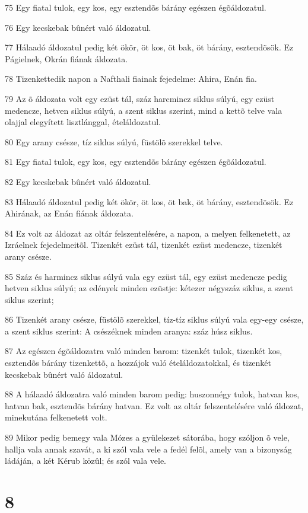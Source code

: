 \par 75 Egy fiatal tulok, egy kos, egy esztendõs bárány egészen égõáldozatul.
\par 76 Egy kecskebak bûnért való áldozatul.
\par 77 Hálaadó áldozatul pedig két ökör, öt kos, öt bak, öt bárány, esztendõsök. Ez Págielnek, Okrán fiának áldozata.
\par 78 Tizenkettedik napon a Nafthali fiainak fejedelme: Ahira, Enán fia.
\par 79 Az õ áldozata volt egy ezüst tál, száz harcmincz siklus súlyú, egy ezüst medencze, hetven siklus súlyú, a szent siklus szerint, mind a kettõ telve vala olajjal elegyített lisztlánggal, ételáldozatul.
\par 80 Egy arany csésze, tíz siklus súlyú, füstölõ szerekkel telve.
\par 81 Egy fiatal tulok, egy kos, egy esztendõs bárány egészen égõáldozatul.
\par 82 Egy kecskebak bûnért való áldozatul.
\par 83 Hálaadó áldozatul pedig két ökör, öt kos, öt bak, öt bárány, esztendõsök. Ez Ahirának, az Enán fiának áldozata.
\par 84 Ez volt az áldozat az oltár felszentelésére, a napon, a melyen felkenetett, az Izráelnek fejedelmeitõl. Tizenkét ezüst tál, tizenkét ezüst medencze, tizenkét arany csésze.
\par 85 Száz és harmincz siklus súlyú vala egy ezüst tál, egy ezüst medencze pedig hetven siklus súlyú; az edények minden ezüstje: kétezer négyszáz siklus, a szent siklus szerint;
\par 86 Tizenkét arany csésze, füstölõ szerekkel, tíz-tíz siklus súlyú vala egy-egy csésze, a szent siklus szerint: A csészéknek minden aranya: száz húsz siklus.
\par 87 Az egészen égõáldozatra való minden barom: tizenkét tulok, tizenkét kos, esztendõs bárány tizenkettõ, a hozzájok való ételáldozatokkal, és tizenkét kecskebak bûnért való áldozatul.
\par 88 A hálaadó áldozatra való minden barom pedig: huszonnégy tulok, hatvan kos, hatvan bak, esztendõs bárány hatvan. Ez volt az oltár felszentelésére való áldozat, minekutána felkenetett volt.
\par 89 Mikor pedig bemegy vala Mózes a gyülekezet sátorába, hogy szóljon õ vele, hallja vala annak szavát, a ki szól vala vele a fedél felõl, amely van a bizonyság ládáján, a két Kérub közûl; és szól vala vele.

\chapter{8}

